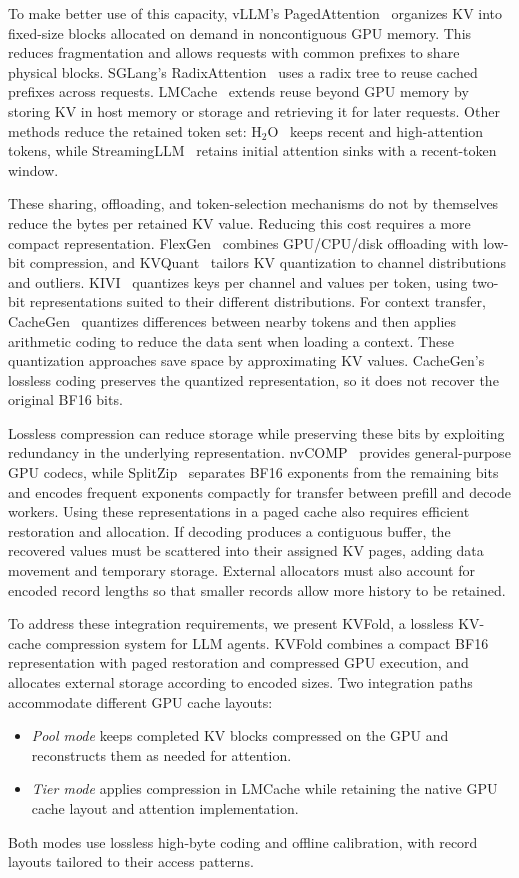 \documentclass[conference]{IEEEtran}
\begin{document}
To make better use of this capacity, vLLM's PagedAttention~\cite{vllm}
organizes KV into fixed-size blocks allocated on demand in noncontiguous GPU
memory. This reduces fragmentation and allows requests with common prefixes to
share physical blocks. SGLang's RadixAttention~\cite{sglang} uses a radix
tree to reuse cached prefixes across requests. LMCache~\cite{lmcache} extends reuse beyond GPU memory
by storing KV in host memory or storage and retrieving it for later requests.
Other methods reduce the retained token set: H$_2$O~\cite{h2o} keeps
recent and high-attention tokens, while StreamingLLM~\cite{streamingllm}
retains initial attention sinks with a recent-token window.

These sharing,
offloading, and token-selection mechanisms do not by themselves reduce the
bytes per retained KV value. Reducing this cost requires a more compact
representation.
FlexGen~\cite{flexgen} combines GPU/CPU/disk offloading with low-bit
compression, and KVQuant~\cite{kvquant} tailors KV quantization to channel
distributions and outliers. KIVI~\cite{kivi} quantizes
keys per channel and values per token, using two-bit representations suited to
their different distributions. For context transfer, CacheGen~\cite{cachegen}
quantizes differences between nearby tokens and then applies arithmetic coding
to reduce the data sent when loading a context. These quantization approaches save space by
approximating KV values. CacheGen's lossless coding preserves the quantized
representation, so it does not recover the original BF16 bits.

Lossless compression can reduce storage while preserving these bits by
exploiting redundancy in the underlying representation. nvCOMP~\cite{nvcomp}
provides general-purpose GPU codecs, while SplitZip~\cite{splitzip} separates
BF16 exponents from the remaining bits and encodes frequent exponents
compactly for transfer between prefill and decode workers. Using these
representations in a paged cache also requires efficient restoration and
allocation. If decoding produces a contiguous buffer, the recovered values
must be scattered into their assigned KV pages, adding data movement and
temporary storage. External allocators must also account for encoded record
lengths so that smaller records allow more history to be retained.

To address these integration requirements, we present KVFold, a lossless
KV-cache compression system for LLM agents. KVFold combines a compact BF16
representation with paged restoration and compressed GPU execution, and
allocates external storage according to encoded sizes. Two integration paths
accommodate different GPU cache layouts:
\begin{itemize}
\item \emph{Pool mode} keeps completed KV blocks compressed on the GPU and
reconstructs them as needed for attention.
\item \emph{Tier mode} applies compression in LMCache while retaining the
native GPU cache layout and attention implementation.
\end{itemize}
Both modes use lossless high-byte coding and offline calibration, with
record layouts tailored to their access patterns.
\end{document}

